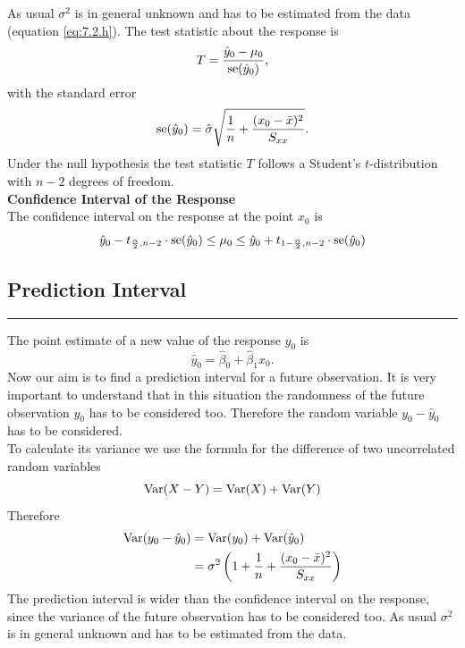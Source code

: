 As usual $\sigma^2$ is in general unknown and has to be estimated from the data (equation \ref{eq:7.2.h}). The test statistic about the response is
\begin{equation}
  T = \frac{\hat{y}_0 - \mu_0}{\textup{se}(\hat{y}_0)},
\end{equation}
with the standard error
\begin{equation}
  \textup{se}(\hat{y}_0)=\hat{\sigma}\sqrt{\frac{1}{n} + \frac{(x_0 - \bar{x})^2}{S_{xx}}}.
\end{equation}
Under the null hypothesis the test statistic $T$ follows a Student’s $t$-distribution with $n - 2$ degrees of freedom.\\

\textbf{Confidence Interval of the Response}\\
The confidence interval on the response at the point $x_0$ is
\begin{equation}
  \hat{y}_0 - t_{\frac{\alpha}{2},n-2} \cdot \textup{se}(\hat{y}_0)
  \leq \mu_0 \leq
  \hat{y}_0 + t_{1 - \frac{\alpha}{2},n-2} \cdot \textup{se}(\hat{y}_0)
\end{equation}

\subsection{Prediction Interval}
\noindent\rule[\linienAbstand]{\linewidth}{\linienDicke}
The point estimate of a new value of the response $y_0$ is
\begin{equation}
  \hat{y}_0 = \hat{\beta}_0 +  \hat{\beta}_1 x_0.
\end{equation}
Now our aim is to find a prediction interval for a future observation. It is very important to understand that in this situation the randomness of the future observation $y_0$ has to be considered too. Therefore the random variable $y_0 - \hat{y}_0$ has to be considered.\\
To calculate its variance we use the formula for the difference of two uncorrelated random variables
\begin{equation}
  \textup{Var}(X - Y) = \textup{Var}(X) + \textup{Var}(Y)
\end{equation}
Therefore
\begin{equation}
  \begin{split}
      \textup{Var}(y_0 - \hat{y}_0) &= \textup{Var}(y_0) + \textup{Var}(\hat{y}_0)\\
      &= \sigma^2\left(1 + \frac{1}{n} + \frac{(x_0 - \bar{x})^2}{S_{xx}}\right)
  \end{split}
\end{equation}
The prediction interval is wider than the confidence interval on the response, since the variance of the future observation has to be considered too. As usual $\sigma^2$ is in general unknown and has to be estimated from the data.\\

